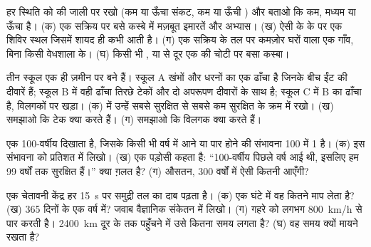 \begin{exercise}[$\star\star$]\label{exo:g9:natural-risks:7}
हर स्थिति को  की जाली पर रखो (कम या ऊँचा संकट, कम या ऊँची ) और बताओ कि
 कम, मध्यम या ऊँचा है। (क) एक सक्रिय  पर बसे कस्बे में मज़बूत इमारतें और अभ्यास।
(ख) ऐसी  के  के  पर एक शिविर स्थल जिसमें शायद ही कभी  आती है। (ग) एक
सक्रिय  के तल पर कमज़ोर घरों वाला एक गाँव, बिना किसी वेधशाला के। (घ) किसी भी
,  या  से दूर एक  की चोटी पर बसा कस्बा।
\end{exercise}

\begin{exercise}[$\star\star$]\label{exo:g9:natural-risks:8}
तीन स्कूल एक ही ज़मीन पर बने हैं। स्कूल A खंभों और धरनों का एक ढाँचा है जिनके बीच ईंट की
दीवारें हैं; स्कूल B में वही ढाँचा तिरछे टेकों और दो अपरूपण दीवारों के साथ है; स्कूल C में
B का ढाँचा है, विलगकों पर खड़ा। (क)  में उन्हें सबसे सुरक्षित से सबसे कम सुरक्षित के
क्रम में रखो। (ख) समझाओ कि टेक क्या करते हैं। (ग) समझाओ कि विलगक क्या करते
हैं।
\end{exercise}

\begin{exercise}[$\star\star$]\label{exo:g9:natural-risks:9}
एक   100-वर्षीय  दिखाता है, जिसके किसी भी वर्ष में आने या पार होने की
संभावना 100 में 1 है। (क) इस संभावना को प्रतिशत में लिखो। (ख) एक पड़ोसी कहता है:
``100-वर्षीय  पिछले वर्ष आई थी, इसलिए हम 99 वर्षों तक सुरक्षित हैं।'' क्या ग़लत है?
(ग) औसतन, 300 वर्षों में ऐसी कितनी 
आएँगी?
\end{exercise}

\begin{exercise}[$\star\star$]\label{exo:g9:natural-risks:10}
एक  चेतावनी केंद्र हर \qty{15}{s} पर समुद्री तल का दाब पढ़ता है। (क) एक घंटे
में वह कितने माप लेता है? (ख) 365 दिनों के एक वर्ष में? जवाब वैज्ञानिक संकेतन में
लिखो। (ग)  गहरे  को लगभग \qty{800}{km/h} से पार करती है।
\qty{2400}{km} दूर के  तक पहुँचने में उसे कितना समय लगता है? (घ) वह समय क्यों मायने
रखता है?
\end{exercise}

